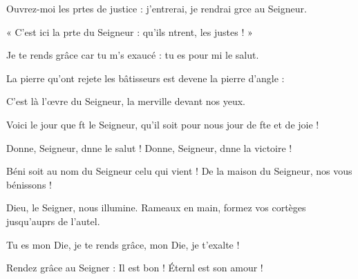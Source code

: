\item Ouvrez-moi les prtes de justice :\psstar{} j’entrerai, je rendrai grce au Seigneur.
\item « C’est ici la prte du Seigneur :\psstar{} qu’ils ntrent, les justes ! »
\item Je te rends grâce car tu m’s exaucé :\psstar{} tu es pour mi le salut.
\item La pierre qu’ont rejete les bâtisseurs\psstar{} est devene la pierre d’angle :
\item C’est là l’œvre du Seigneur,\psstar{} la merville devant nos yeux.
\item Voici le jour que ft le Seigneur,\psstar{} qu’il soit pour nous jour de fte et de joie !
\item Donne, Seigneur, dnne le salut !\psstar{} Donne, Seigneur, dnne la victoire !
\item Béni soit au nom du Seigneur celu qui vient !\psstar{} De la maison du Seigneur, nos vous bénissons !
\item Dieu, le Seigner, nous illumine.\psstar{} Rameaux en main, formez vos cortèges jusqu’auprs de l’autel.
\item Tu es mon Die, je te rends grâce,\psstar{} mon Die, je t’exalte !
\item Rendez grâce au Seigner : Il est bon !\psstar{} Éternl est son amour !